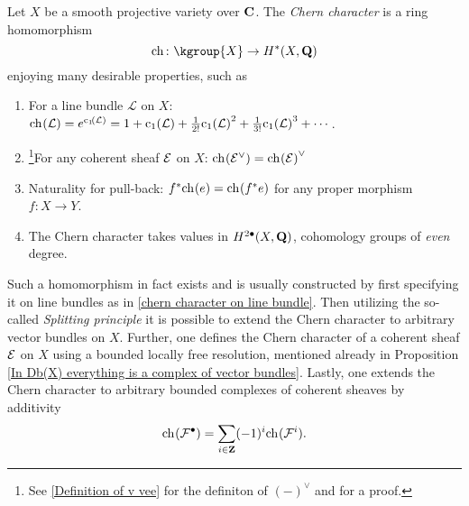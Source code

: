 \begin{definition}
    \label{Definition of Chern character}
    Let $X$ be a smooth projective variety over $\mathbf C$. The \emph{Chern character} is a ring homomorphism
    \[
        \ch[] \colon \kgroup{X} \to \cohom{*}{X}{\Q}
    \] 
    enjoying many desirable properties, such as
    \begin{enumerate}[label = (\roman*)]
        \item{For a line bundle $\mathcal L$ on $X$: $\ch[](\mathcal L) = e^{\cclass[1]{\mathcal L}} = 1 + \cclass[1]{\mathcal L} + \frac{1}{2!}\cclass[1]{\mathcal L}^2 + \frac{1}{3!}\cclass[1]{\mathcal L}^3 + \cdots$.
        } \label{chern character on line bundle}
        \item{\footnote{
            See \ref{Definition of v vee} for the definiton of $(-)^\vee$ and \cite[Lemma C.7]{vanBree2020} for a proof.
        }For any coherent sheaf $\mathcal E$ on $X$: $\ch[]{\E^\vee} = \ch[]{\E}^\vee$}
        \item{Naturality for pull-back: $f^*\ch[]{e} = \ch[]{f^*e}$ for any proper morphism $f \colon X \to Y$.}
        \item{The Chern character takes values in $H^{2\bullet}(X, \mathbf Q)$, \ie cohomology groups of \emph{even} degree.}
    \end{enumerate} 
\end{definition}

\begin{remark}
    Such a homomorphism in fact exists and is usually constructed by first specifying it on line bundles as in \ref{chern character on line bundle}. Then utilizing the so-called \emph{Splitting principle} \cite[text]{Fulton1998} it is possible to extend the Chern character to arbitrary vector bundles on $X$. Further, one defines the Chern character of a coherent sheaf $\mathcal E$ on $X$ using a bounded locally free resolution, mentioned already in Proposition \ref{In Db(X) everything is a complex of vector bundles}. Lastly, one extends the Chern character to arbitrary bounded complexes of coherent sheaves by additivity \ie
    \[
        \ch[](\F^\bullet) = \sum_{i \in \Z}(-1)^i\ch[](\F^i).
    \] 
\end{remark}




